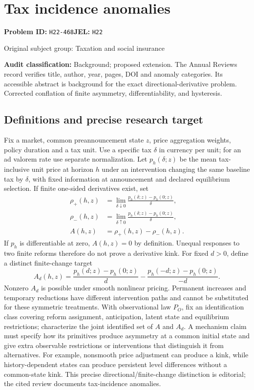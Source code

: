 \documentclass[11pt,a4paper]{article}
\begin{document}
\section*{Tax incidence anomalies}
\textbf{Problem ID:} \texttt{H22-468}\quad \textbf{JEL:} \texttt{H22}\par
\label{problem:OP-0476}
{\sffamily\small\color{muted}Original subject group: Taxation and social insurance\par}
\label{definitions:problem:30007758}
\textbf{Audit classification:} Background; proposed extension. The Annual Reviews record verifies title, author, year, pages, DOI and anomaly categories. Its accessible abstract is background for the exact directional-derivative problem. Corrected conflation of finite asymmetry, differentiability, and hysteresis.
\subsection*{Definitions and precise research target}
Fix a market, common preannouncement state \(z\), price aggregation weights, policy duration and a tax unit. Use a specific tax \(\delta\) in currency per unit; for an ad valorem rate use separate normalization. Let \(p_h(\delta;z)\) be the mean tax-inclusive unit price at horizon \(h\) under an intervention changing the same baseline tax by \(\delta\), with fixed information at announcement and declared equilibrium selection. If finite one-sided derivatives exist, set
\[
\begin{aligned}
 \rho_+(h,z)&=\lim_{\delta\downarrow0}\frac{p_h(\delta;z)-p_h(0;z)}{\delta},\\
 \rho_-(h,z)&=\lim_{\delta\uparrow0}\frac{p_h(\delta;z)-p_h(0;z)}{\delta},\\
 A(h,z)&=\rho_+(h,z)-\rho_-(h,z).
\end{aligned}
\]
If \(p_h\) is differentiable at zero, \(A(h,z)=0\) by definition. Unequal responses to two finite reforms therefore do not prove a derivative kink. For fixed \(d>0\), define a distinct finite-change target
\[
 A_d(h,z)=\frac{p_h(d;z)-p_h(0;z)}d
 -\frac{p_h(-d;z)-p_h(0;z)}{-d}.
\]
Nonzero \(A_d\) is possible under smooth nonlinear pricing. Permanent increases and temporary reductions have different intervention paths and cannot be substituted for these symmetric treatments. With observational law \(P_O\), fix an identification class covering reform assignment, anticipation, latent state and equilibrium restrictions; characterize the joint identified set of \(A\) and \(A_d\). A mechanism claim must specify how its primitives produce asymmetry at a common initial state and give extra observable restrictions or interventions that distinguish it from alternatives. For example, nonsmooth price adjustment can produce a kink, while history-dependent states can produce persistent level differences without a common-state kink. This precise directional/finite-change distinction is editorial; the cited review documents tax-incidence anomalies.
\end{document}
